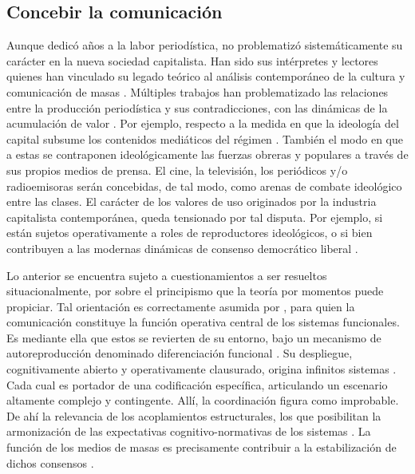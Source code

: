 \documentclass{textolivre}
\begin{document}
\subsection{Concebir la comunicación}\label{sec-concebir}
Aunque dedicó años a la labor periodística, \textcite{marx2013} no problematizó
sistemáticamente su carácter en la nueva sociedad capitalista. Han sido sus intérpretes y
lectores quienes han vinculado su legado teórico al análisis contemporáneo de la cultura y
comunicación de masas \cite{mosco2016}. Múltiples trabajos han problematizado
las relaciones entre la producción periodística y sus contradicciones, con las dinámicas
de la acumulación de valor \cite{Santander2014}. Por ejemplo, respecto a la medida en
que la ideología del capital subsume los contenidos mediáticos del régimen
\cite{sapiezynska2013}. También el modo en que a estas se
contraponen ideológicamente las fuerzas obreras y populares a través de sus propios
medios de prensa. El cine, la televisión, los periódicos y/o radioemisoras serán
concebidas, de tal modo, como arenas de combate ideológico entre las clases. El carácter
de los valores de uso originados por la industria capitalista contemporánea, queda
tensionado por tal disputa. Por ejemplo, si están sujetos operativamente a roles de
reproductores ideológicos, o si bien contribuyen a las modernas dinámicas de consenso
democrático liberal \cite{Habermas2006}.

Lo anterior se encuentra sujeto a cuestionamientos a ser resueltos
situacionalmente, por sobre el principismo que la teoría por momentos puede propiciar. Tal
orientación es correctamente asumida por \textcite{Luhmann1991}, para quien la comunicación
constituye la función operativa central de los sistemas funcionales. Es mediante ella que
estos se revierten de su entorno, bajo un mecanismo de autoreproducción denominado
diferenciación funcional \cite{Tkke2010}. Su despliegue, cognitivamente
abierto y operativamente clausurado, origina infinitos sistemas \cite{billi2017}. 
Cada cual es portador de una codificación específica, articulando un escenario
altamente complejo y contingente. Allí, la coordinación figura como improbable. De ahí la
relevancia de los acoplamientos estructurales, los que posibilitan la armonización de las
expectativas cognitivo-normativas de los sistemas \cite{Luhmann2007}. La función de los
medios de masas es precisamente contribuir a la estabilización de dichos consensos
\cite{becerra2013}.
\end{document}

